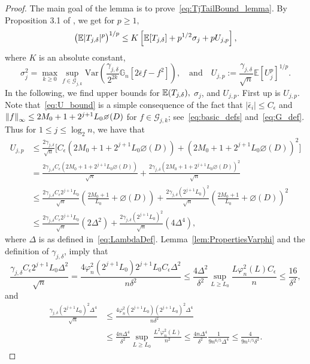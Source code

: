 \begin{proof}


 The main goal of the lemma is to prove~\eqref{eq:TjTailBound_lemma}. By Proposition 3.1 of \cite{Gine00}, we get for $p\ge 1,$
\begin{equation}\label{eq:MomentBoundEmpProc}
\big(\mathbb{E}|T_{j,\delta}|^p\big)^{1/p} \le K\left[\mathbb{E}[T_{j,\delta}] + p^{1/2}\sigma_j + pU_{j,p}\right],
\end{equation}
where $K$ is an absolute constant, 
\[
\sigma_j^2 = \max_{k \ge 0}\sup_{f\in\mathcal{G}_{j,k}} \mbox{Var}\left(\frac{\gamma_{j,\delta}}{2^{2k}}\mathbb{G}_n[2\bar\epsilon  f - f^2]\right),\quad \text{and}\quad
U_{j,p} := \frac{\gamma_{j,\delta}}{\sqrt{n}} \mathbb{E}\left[U_j^p\right]^{1/p}.
\]
In the following, we find upper bounds for $\mathbb{E}(T_{j,\delta}),$ $ \sigma_j$, and $U_{j,p}$. First up is $U_{j,p}$.  Note that~\eqref{eq:U_bound} is a simple consequence of the fact that $|\bar\epsilon_{i}| \le C_{\epsilon}$ and $\norm{f}_{\infty} \le 2M_0 + 1 + 2^{j+1}L_0\diameter(D)$ for $f\in\mathcal{G}_{j,k}$; see~\eqref{eq:basic_defs} and~\eqref{eq:G_def}. Thus for $1\le j \le \log_2 n$, we have that
\begin{align*}
U_{j,p} &\le \frac{2\gamma_{j,\delta}}{\sqrt{n}}\Big[C_{\epsilon}(2M_0 + 1 + 2^{j+1}L_0\diameter(D)) + (2M_0 + 1 + 2^{j+1}L_0\diameter(D))^2\Big]\\
&= \frac{2\gamma_{j,\delta}C_{\epsilon}(2M_0 + 1 + 2^{j+1}L_0\diameter(D))}{\sqrt{n}} + \frac{2\gamma_{j,\delta}(2M_0 + 1 + 2^{j+1}L_0\diameter(D))^2}{\sqrt{n}}\\
&\le \frac{2\gamma_{j,\delta}C_{\epsilon}2^{j+1}L_0}{\sqrt{n}}\left(\frac{2M_0 + 1}{L_0} + \diameter(D)\right) + \frac{2\gamma_{j,\delta}(2^{j+1}L_0)^2}{\sqrt{n}}\left(\frac{2M_0 + 1}{L_0} + \diameter(D)\right)^2\\
&\le \frac{2\gamma_{j,\delta}C_{\epsilon}2^{j+1}L_0}{\sqrt{n}}(2\Delta^2) + \frac{2\gamma_{j,\delta}(2^{j+1}L_0)^2}{\sqrt{n}}(4\Delta^4),
\end{align*}
where $\Delta$ is as defined in~\eqref{eq:LambdaDef}. Lemma~\ref{lem:PropertiesVarphi} and the definition of  $\gamma_{j,\delta}$, imply that
\[
\frac{\gamma_{j,\delta}C_{\epsilon}2^{j+1}L_0\Delta^2}{\sqrt{n}} = \frac{4\varphi_n^2(2^{j+1}L_0)2^{j+1}L_0C_{\epsilon}\Delta^2}{n\delta^2} \le \frac{4\Delta^2}{\delta^2}\sup_{L \ge L_0}\frac{L\varphi_n^2(L)C_{\epsilon}}{n} \le \frac{16}{\delta^2},
\]
and
\begin{align*}
\frac{\gamma_{j,\delta}(2^{j+1}L_0)^2\Delta^4}{\sqrt{n}} &\le \frac{4\varphi_n^2(2^{j+1}L_0)(2^{j+1}L_0)^2\Delta^4}{n\delta^2}\\ &\le \frac{4n\Delta^4}{\delta^2}\sup_{L\ge L_0}\frac{L^2\varphi_n^2(L)}{n^2} \le \frac{4n\Delta^4}{\delta^2}\frac{1}{9n^{6/5}\Delta^4} \le \frac{4}{9n^{1/5}\delta^2}.

\end{align*}
\end{proof}
